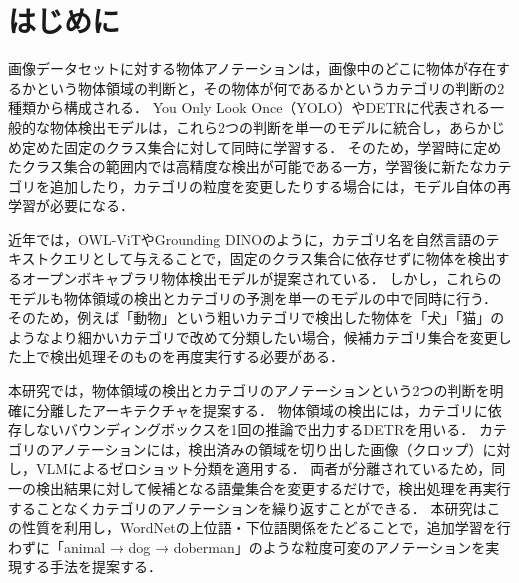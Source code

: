\section{はじめに}
画像データセットに対する物体アノテーションは，画像中のどこに物体が存在するかという物体領域の判断と，その物体が何であるかというカテゴリの判断の2種類から構成される．
You Only Look Once（YOLO）\cite{ref_YOLO}やDETR\cite{ref_DETR}に代表される一般的な物体検出モデルは，これら2つの判断を単一のモデルに統合し，あらかじめ定めた固定のクラス集合に対して同時に学習する．
そのため，学習時に定めたクラス集合の範囲内では高精度な検出が可能である一方，学習後に新たなカテゴリを追加したり，カテゴリの粒度を変更したりする場合には，モデル自体の再学習が必要になる．

近年では，OWL-ViT\cite{ref_OWLViT}やGrounding DINO\cite{ref_GDINO}のように，カテゴリ名を自然言語のテキストクエリとして与えることで，固定のクラス集合に依存せずに物体を検出するオープンボキャブラリ物体検出モデルが提案されている．
しかし，これらのモデルも物体領域の検出とカテゴリの予測を単一のモデルの中で同時に行う．
そのため，例えば「動物」という粗いカテゴリで検出した物体を「犬」「猫」のようなより細かいカテゴリで改めて分類したい場合，候補カテゴリ集合を変更した上で検出処理そのものを再度実行する必要がある．

本研究では，物体領域の検出とカテゴリのアノテーションという2つの判断を明確に分離したアーキテクチャを提案する．
物体領域の検出には，カテゴリに依存しないバウンディングボックスを1回の推論で出力するDETRを用いる．
カテゴリのアノテーションには，検出済みの領域を切り出した画像（クロップ）に対し，VLMによるゼロショット分類を適用する．
両者が分離されているため，同一の検出結果に対して候補となる語彙集合を変更するだけで，検出処理を再実行することなくカテゴリのアノテーションを繰り返すことができる．
本研究はこの性質を利用し，WordNet\cite{ref_WordNet}の上位語・下位語関係をたどることで，追加学習を行わずに「animal → dog → doberman」のような粒度可変のアノテーションを実現する手法を提案する．

